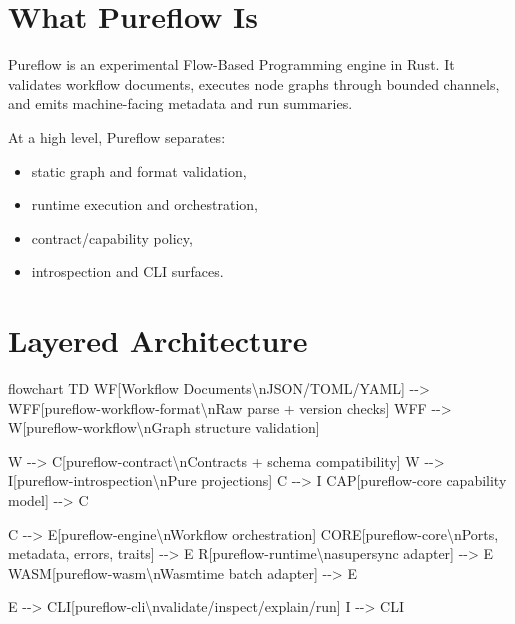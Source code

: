 \documentclass[
  letterpaper,
]{report}
\newenvironment{Shaded}{\begin{snugshade}}{\end{snugshade}}
\newcommand{\NormalTok}[1]{\textcolor[rgb]{0.00,0.23,0.31}{#1}}
\providecommand{\tightlist}{%
  \setlength{\itemsep}{0pt}\setlength{\parskip}{0pt}}
\begin{document}
\section{What Pureflow Is}\label{what-pureflow-is}

Pureflow is an experimental Flow-Based Programming engine in Rust. It
validates workflow documents, executes node graphs through bounded
channels, and emits machine-facing metadata and run summaries.

At a high level, Pureflow separates:

\begin{itemize}
\tightlist
\item
  static graph and format validation,
\item
  runtime execution and orchestration,
\item
  contract/capability policy,
\item
  introspection and CLI surfaces.
\end{itemize}

\section{Layered Architecture}\label{layered-architecture}

\begin{Shaded}
\begin{Highlighting}[]
\NormalTok{flowchart TD}
\NormalTok{    WF[Workflow Documents\textbackslash{}nJSON/TOML/YAML] {-}{-}\textgreater{} WFF[pureflow{-}workflow{-}format\textbackslash{}nRaw parse + version checks]}
\NormalTok{    WFF {-}{-}\textgreater{} W[pureflow{-}workflow\textbackslash{}nGraph structure validation]}

\NormalTok{    W {-}{-}\textgreater{} C[pureflow{-}contract\textbackslash{}nContracts + schema compatibility]}
\NormalTok{    W {-}{-}\textgreater{} I[pureflow{-}introspection\textbackslash{}nPure projections]}
\NormalTok{    C {-}{-}\textgreater{} I}
\NormalTok{    CAP[pureflow{-}core capability model] {-}{-}\textgreater{} C}

\NormalTok{    C {-}{-}\textgreater{} E[pureflow{-}engine\textbackslash{}nWorkflow orchestration]}
\NormalTok{    CORE[pureflow{-}core\textbackslash{}nPorts, metadata, errors, traits] {-}{-}\textgreater{} E}
\NormalTok{    R[pureflow{-}runtime\textbackslash{}nasupersync adapter] {-}{-}\textgreater{} E}
\NormalTok{    WASM[pureflow{-}wasm\textbackslash{}nWasmtime batch adapter] {-}{-}\textgreater{} E}

\NormalTok{    E {-}{-}\textgreater{} CLI[pureflow{-}cli\textbackslash{}nvalidate/inspect/explain/run]}
\NormalTok{    I {-}{-}\textgreater{} CLI}
\end{Highlighting}
\end{Shaded}
\end{document}
